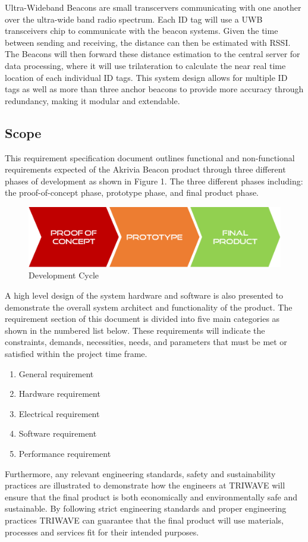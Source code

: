 \bigskip
Ultra-Wideband Beacons are small transcervers communicating with one another over the ultra-wide band radio spectrum. Each ID tag will use a UWB transceivers chip to communicate with the beacon systems. Given the time between sending and receiving, the distance can then be estimated with RSSI. The Beacons will then forward these distance estimation to the central server for data processing, where it will use trilateration to calculate the near real time location of each individual ID tags. This system design allows for multiple ID tags as well as more than three anchor beacons to provide more accuracy through redundancy, making it modular and extendable.

\break

\subsection{Scope}
This requirement specification document outlines functional and non-functional requirements expected of the Akrivia Beacon product through three different phases of development as shown in Figure 1. The three different phases  including: the proof-of-concept phase, prototype phase, and final product phase.
\medskip

\begin{figure}[H]
\centering
    \includegraphics[scale=0.4]{./images/dev-path.png}
    \caption{Development Cycle}
\end{figure}

A high level design of the system hardware and software is also presented to demonstrate the overall system architect and functionality of the product. The requirement section of this document is divided into five main categories as shown in the numbered list below. These requirements will indicate the constraints, demands, necessities, needs, and parameters that must be met or satisfied within the project time frame.

\begin{enumerate}
	\item General requirement 
	\item Hardware requirement 
	\item Electrical requirement 
	\item Software requirement 
	\item Performance requirement 
\end{enumerate}
\medskip
Furthermore, any relevant engineering standards, safety and sustainability practices are illustrated to demonstrate how the engineers at TRIWAVE will ensure that the final product is both economically and environmentally safe and sustainable. By following strict engineering standards and proper engineering practices TRIWAVE can guarantee that the final product will use materials, processes and services fit for their intended purposes.

